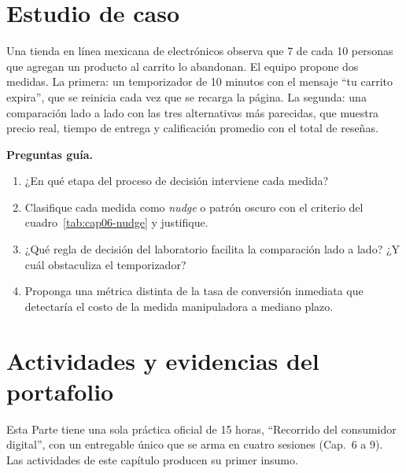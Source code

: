 \section{Estudio de caso}
\label{sec:cap06-caso}

\begin{casoFicticio}
Una tienda en línea mexicana de electrónicos observa que 7 de cada 10
personas que agregan un producto al carrito lo abandonan. El equipo propone
dos medidas. La primera: un temporizador de 10 minutos con el mensaje
\enquote{tu carrito expira}, que se reinicia cada vez que se recarga la
página. La segunda: una comparación lado a lado con las tres alternativas más
parecidas, que muestra precio real, tiempo de entrega y calificación
promedio con el total de reseñas.

\textbf{Preguntas guía.}
\begin{enumerate}
  \item ¿En qué etapa del proceso de decisión interviene cada medida?
  \item Clasifique cada medida como \textit{nudge} o patrón oscuro con el
  criterio del cuadro~\ref{tab:cap06-nudge} y justifique.
  \item ¿Qué regla de decisión del laboratorio facilita la comparación lado a
  lado? ¿Y cuál obstaculiza el temporizador?
  \item Proponga una métrica distinta de la tasa de conversión inmediata que
  detectaría el costo de la medida manipuladora a mediano plazo.
\end{enumerate}
\end{casoFicticio}

\section{Actividades y evidencias del portafolio}

Esta Parte tiene una sola práctica oficial de 15 horas, \enquote{Recorrido del
consumidor digital}, con un entregable único que se arma en cuatro sesiones
(Cap.~6 a 9). Las actividades de este capítulo producen su primer insumo.

